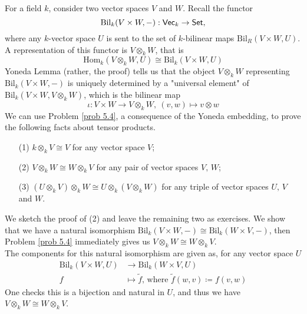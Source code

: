 \begin{example}\label{tensvec}
For a field $k$, consider two vector spaces $V$ and $W$. Recall the functor
\[\mathrm{Bil}_k(V \times W,-):\mathsf{Vec}_k \to \mathsf{Set},\]
where any $k$-vector space $U$ is sent to the set of $k$-bilinear maps $\mathrm{Bil}_R(V \times W,U)$. A representation of this functor is $V \otimes_k W$, that is
\[\mathrm{Hom}_k(V \otimes_k W,U) \cong \mathrm{Bil}_k(V \times W,U)\]
Yoneda Lemma (rather, the proof)  tells us that the object $V \otimes_k W$ representing $\mathrm{Bil}_k(V \times W,-)$ is uniquely determined by a "universal element" of $\mathrm{Bil}_k(V \times W,V\otimes_k W)$, which is the bilinear map
\[\iota:V \times W \to V \otimes_k W,\ (v,w) \mapsto v\otimes w\]
We can use Problem \ref{prob 5.4}, a consequence of the Yoneda embedding, to prove the following facts about tensor products.
\begin{itemize}
\item[(1)] $k\otimes_k V \cong V$ for any vector space $V$;
\item[(2)] $V \otimes_k W \cong W \otimes_k V$ for any pair of vector spaces $V,\,W$;
\item[(3)] $(U\otimes_k V)\otimes_k W \cong U \otimes_k (V \otimes_k W)$ for any triple of vector spaces $U,\,V$ and $W$.
\end{itemize}
We sketch the proof of (2) and leave the remaining two as exercises. We show that we have a natural isomorphism $\mathrm{Bil}_k(V \times W,-) \cong \mathrm{Bil}_k(W \times V,-)$, then Problem \ref{prob 5.4} immediately gives us $V \otimes_k W \cong W \otimes_k V$.\\[0.5em]
The components for this natural isomorphism are given as, for any vector space $U$
\begin{align*}
\mathrm{Bil}_k(V \times W,U) &\to \mathrm{Bil}_k(W \times V,U)\\[0.5em]
f &\mapsto \tilde{f} \text{, where }\tilde{f}(w,v) \coloneqq f(v,w)
\end{align*}
One checks this is a bijection and natural in $U$, and thus we have $V \otimes_k W \cong W \otimes_k V$.
\end{example}

\vspace*{0.1in}

